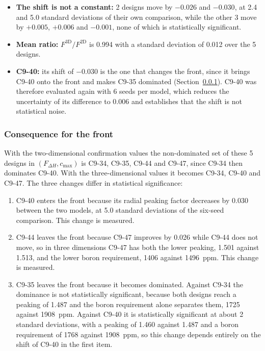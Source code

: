 \begin{itemize}
  \item \textbf{The shift is not a constant:} 2 designs move by
        $-0.026$ and $-0.030$, at 2.4 and 5.0 standard deviations of
        their own comparison, while the other 3 move by $+0.005$,
        $+0.006$ and $-0.001$, none of which is statistically
        significant.
  \item \textbf{Mean ratio:} $F^\mathrm{3D}/F^\mathrm{2D}$ is 0.994
        with a standard deviation of 0.012 over the 5 designs.
  \item \textbf{C9-40:} its shift of $-0.030$ is the one that changes
        the front, since it brings C9-40 onto the front and makes C9-35
        dominated (Section~\ref{sec:res-c9-peak-front}). C9-40 was
        therefore evaluated again with 6 seeds per model, which reduces
        the uncertainty of its difference to 0.006 and establishes that
        the shift is not statistical noise.
\end{itemize}

\subsubsection{Consequence for the front}
\label{sec:res-c9-peak-front}
With the two-dimensional confirmation values the non-dominated set of these
5 designs in $(F_{\Delta H}, c_\mathrm{max})$ is C9-34, C9-35, C9-44 and
C9-47, since C9-34 then dominates C9-40. With the three-dimensional values
it becomes C9-34, C9-40 and C9-47. The three changes differ in statistical
significance:

\begin{enumerate}
  \item C9-40 enters the front because its radial peaking factor decreases by
        0.030 between the two models, at 5.0 standard deviations of the
        six-seed comparison. This change is measured.

  \item C9-44 leaves the front because C9-47 improves by 0.026 while C9-44
        does not move, so in three dimensions C9-47 has both the lower
        peaking, 1.501 against 1.513, and the lower boron requirement, 1406
        against \SI{1496}{ppm}. This change is measured.

  \item C9-35 leaves the front because it becomes dominated. Against C9-34
        the dominance is not statistically significant, because both designs reach a peaking
        of 1.487 and the boron requirement alone separates them, 1725
        against \SI{1908}{ppm}. Against C9-40 it is statistically significant at about 2
        standard deviations, with a peaking of 1.460 against 1.487 and a
        boron requirement of 1768 against \SI{1908}{ppm}, so this change depends entirely on the shift of C9-40 in the first item.
\end{enumerate}


